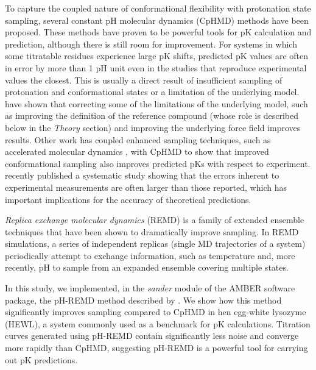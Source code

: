 To capture the coupled nature of conformational flexibility with protonation
state sampling, several constant pH molecular dynamics (CpHMD) methods have been
proposed. \cite{Baptista1997, Baptista2002, Burgi2002, Lee2004, Borjesson2004,
Mongan2004, Khandogin2005} These methods have proven to be powerful tools for
pK calculation and prediction, although there is still room for
improvement. \cite{Alexov2011} For systems in which some titratable residues
experience large pK shifts, predicted pK values are often in error
by more than 1 pH unit even in the studies that reproduce experimental values
the closest. \cite{Alexov2011} This is usually a direct result of insufficient
sampling of protonation and conformational states or a limitation of the
underlying model. \citeauthor{Machuqueiro2011} have shown that correcting some
of the limitations of the underlying model, such as improving the definition of
the reference compound (whose role is described below in the \emph{Theory}
section) and improving the underlying force field improves results.
\cite{Machuqueiro2011} Other work has coupled enhanced sampling techniques, such
as accelerated molecular dynamics \cite{Hamelberg2004}, with CpHMD to show that
improved conformational sampling also improves predicted pKs with respect
to experiment. \cite{Williams2010} \citeauthor{Webb2011} recently published a
systematic study showing that the errors inherent to experimental measurements
are often larger than those reported, which has important implications for the
accuracy of theoretical predictions. \cite{Webb2011}

\emph{Replica exchange molecular dynamics} (REMD) is a family of extended
ensemble techniques that have been shown to dramatically improve sampling.
\cite{Sugita1999, Pitera2003, Chodera2011, Nadler2008, Meng2010, Meng2011a} In
REMD simulations, a series of independent replicas (single MD trajectories of a
system) periodically attempt to exchange information, such as temperature
\cite{Sugita1999,Pitera2003} and, more recently, pH \cite{Itoh2011,Wallace2011}
to sample from an expanded ensemble covering multiple states.

In this study, we implemented, in the \emph{sander} module of the AMBER
\cite{AMBER12} software package, the pH-REMD method described by
\citeauthor{Itoh2011} \cite{Itoh2011}. We show how this method significantly
improves sampling compared to CpHMD in hen egg-white lysozyme (HEWL), a system
commonly used as a benchmark for pK calculations. Titration curves
generated using pH-REMD contain significantly less noise and converge more
rapidly than CpHMD, suggesting pH-REMD is a powerful tool for carrying out
pK predictions.

